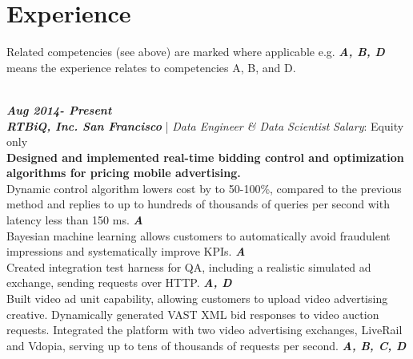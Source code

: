 \documentclass[11pt, a4paper]{article}
\begin{document}
\section*{\color{mycolor4}Experience} \singlespace Related competencies (see above) are marked where applicable e.g. \textit{\textbf{{\color{mycolor1}A, B, D}}} means the experience relates to competencies A, B, and D. 

\noindent
\\
\textit{\textbf{Aug 2014- Present}\\\textbf{\emph{RTBiQ, Inc. San Francisco}} }| \emph{Data Engineer \& Data Scientist} \newline
\textit{Salary}: Equity only \\
 \textbf{{\color{mycolor2}Designed and implemented real-time bidding control and optimization algorithms for pricing mobile advertising.}} \\ \textbullet Dynamic control algorithm lowers cost by to 50-100\%, compared to the previous method and replies to up to hundreds of thousands of queries per second with latency less than 150 ms. \textit{\textbf{{\color{mycolor1}A}}} \\ \textbullet Bayesian machine learning allows customers to automatically avoid fraudulent impressions and systematically improve KPIs. \textit{\textbf{{\color{mycolor1}A}}}\\ \textbullet 
Created integration test harness for QA, including a realistic simulated ad exchange, sending requests over HTTP. \textit{\textbf{{\color{mycolor1}A, D}}}%
\\ \textbullet Built video ad unit capability, allowing customers to upload video advertising creative. Dynamically generated VAST XML bid responses to video auction requests. Integrated the platform with two video advertising exchanges, LiveRail and Vdopia, serving up to tens of thousands of requests per second. \textit{\textbf{{\color{mycolor1}A, B, C, D}}}\\
\end{document}
